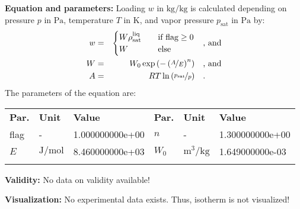 \textbf{Equation and parameters:}
\newline
%
Loading $w$ in $\si{\kilogram\per\kilogram}$ is calculated depending on pressure $p$ in $\si{\pascal}$, temperature $T$ in $\si{\kelvin}$, and vapor pressure $p_\mathrm{sat}$ in $\si{\pascal}$ by:
%
\begin{equation*}
\begin{split}
w &=& \begin{cases} W \rho_\mathrm{sat}^{\mathrm{liq}} & \quad \text{if flag} \geq 0 \\ W & \quad \text{else} \end{cases} & \quad\text{, and} \\
W &=& W_0 \exp \left( - \left( \nicefrac{A}{E} \right) ^{n} \right) & \quad\text{, and} \\
A &=& R T \ln \left( \nicefrac{p_\mathrm{sat}}{p} \right) & \quad\text{.} \\
\end{split}
\end{equation*}
%
The parameters of the equation are:
%
\begin{longtable}[l]{lll|lll}
\toprule
\addlinespace
\textbf{Par.} & \textbf{Unit} & \textbf{Value} &	\textbf{Par.} & \textbf{Unit} & \textbf{Value} \\
\addlinespace
\midrule
\endhead

\bottomrule
\endfoot
\bottomrule
\endlastfoot
\addlinespace

flag & - & 1.000000000e+00 & $n$ & - & 1.300000000e+00 \\
$E$ & $\si{\joule\per\mole}$ & 8.460000000e+03 & $W_0$ & $\si{\cubic\meter\per\kilogram}$ & 1.649000000e-03 \\

\addlinespace\end{longtable}

\textbf{Validity:}
\newline
No data on validity available!
\newline

\textbf{Visualization:}
%
\newline
No experimental data exists. Thus, isotherm is not visualized!
%

\FloatBarrier
\newpage
